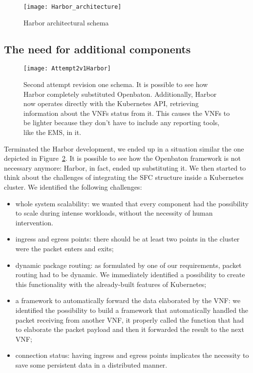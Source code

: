 \begin{figure}[t]
 \centering
 \texttt{[image: Harbor\_architecture]}
 \caption[Harbor architectural schema]{Harbor architectural schema}
 \label{chap:archimpl:sec:secondattempt:img:harborarchitecture}
\end{figure}

\subsection{The need for additional components}

\begin{figure}[t]
  \centering
  \texttt{[image: Attempt2v1Harbor]}
  \caption[Second attempt revision one schema]{Second attempt revision one
    schema. It is possible to see how Harbor completely substituted Openbaton.
    Additionally, Harbor now operates directly with the Kubernetes API,
    retrieving information about the VNFs status from it. This causes the VNFs
    to be lighter because they don't have to include any reporting tools, like
    the EMS, in it.}
  \label{chap:archimple:sec:secondattempt:img:attempt2v1harbor}
\end{figure}

Terminated the Harbor development, we ended up in a situation similar the one
depicted in Figure~\ref{chap:archimple:sec:secondattempt:img:attempt2v1harbor}.
It is possible to see how the Openbaton framework is not necessary anymore:
Harbor, in fact, ended up substituting it. We then started to think about the
challenges of integrating the SFC structure inside a Kubernetes cluster. We
identified the following challenges:
\begin{itemize}
\item whole system scalability: we wanted that every component had the
  possibility to scale during intense workloads, without the necessity of human
  intervention.
\item ingress and egress points: there should be at least two points in the
  cluster were the packet enters and exits;
\item dynamic package routing: as formulated by one of our requirements, packet
  routing had to be dynamic. We immediately identified a possibility to create
  this functionality with the already-built features of Kubernetes;
\item a framework to automatically forward the data elaborated by the VNF: we
  identified the possibility to build a framework that automatically handled the
  packet receiving from another VNF, it properly called the function that had to
  elaborate the packet payload and then it forwarded the result to the next VNF;
\item connection status: having ingress and egress points implicates the
  necessity to save some persistent data in a distributed manner.
\end{itemize}

